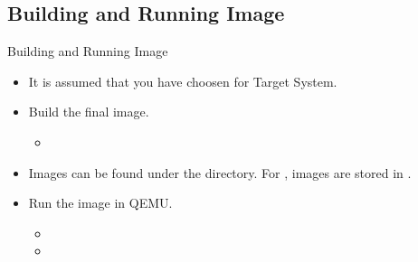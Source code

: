 \subsection{Building and Running Image}
\begin{frame}[fragile]{Building and Running Image}
    \pause
    \begin{itemize}[<+-|alert@+>]
        \item It is assumed that you have choosen  for Target System.
        \item Build the final image.
        \begin{itemize}
            \item {}
        \end{itemize}
        \item Images can be found under the  directory. For , images are stored in .
        \item Run the image in QEMU.
        \begin{itemize}
            \item {}
            \item {}
        \end{itemize}
    \end{itemize}
\end{frame}